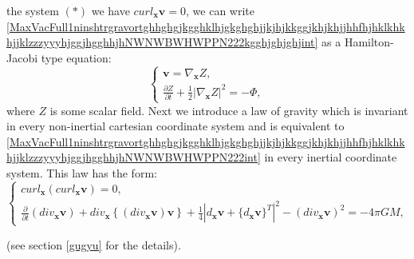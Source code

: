 \documentclass{article}
\theoremstyle{definition}
\theoremstyle{remark}
\renewcommand{\vec}[1]{\mathbf{#1}}
\newcommand{\er}{\eqref}
\newcommand{\er}{\eqref}
\begin{document}
the system $(*)$ we have $curl_{\vec x}\vec v=0$, we can write
\er{MaxVacFull1ninshtrgravortghhghgjkgghklhjgkghghjjkjhjkkggjkhjkhjjhhfhjhklkhkhjjklzzzyyyhjggjhgghhjhNWNWBWHWPPN222kgghjghjghjint}
as a Hamilton-Jacobi type equation:
\begin{equation}
\label{MaxVacFull1ninshtrgravortghhghgjkgghklhjgkghghjjkjhjkkggjkhjkhjjhhfhjhklkhkhjjklzzzyyyhjggjhgghhjhNWNWNWNWNWBWHWPPN222int}
\begin{cases}
\vec v=\nabla_{\vec x}Z,\\
\frac{\partial Z}{\partial t}+\frac{1}{2}\left|\nabla_{\vec
x}Z\right|^2=-\Phi,
\end{cases}
\end{equation}
where $Z$ is some scalar field. Next we introduce a law of gravity
which is invariant in every non-inertial cartesian coordinate system
and is equivalent to
\er{MaxVacFull1ninshtrgravortghhghgjkgghklhjgkghghjjkjhjkkggjkhjkhjjhhfhjhklkhkhjjklzzzyyyhjggjhgghhjhNWNWBWHWPPN222int}
in every inertial coordinate system. This law has the form:
\begin{equation}
\label{MaxVacFull1ninshtrgravortghhghgjkgghklhjgkghghjjkjhjkkggjkhjkhjjhhfhjhklkhkhjjklzzzyyyNWBWHWPPN222int}
\begin{cases}
curl_{\vec x}\left(curl_{\vec x}\vec v\right)= 0,\\
\frac{\partial}{\partial t}\left(div_{\vec x}\vec v\right)+div_{\vec
x}\left\{\left(div_{\vec x}\vec v\right)\vec
v\right\}+\frac{1}{4}\left|d_{\vec x}\vec v+\{d_{\vec x}\vec
v\}^T\right|^2-\left(div_{\vec x}\vec v\right)^2= -4\pi GM,
\end{cases}
\end{equation}
%
%
%
\begin{comment}
\begin{equation}
\label{MaxVacFull1ninshtrgravortghhghgjkgghklhjgkghghjjkjhjkkggjkhjkhjjhhfhjhklkhkhjjklzzzyyyNWBWHWPPN222jkgghggyuhgulkip}
\begin{cases}
curl_{\vec x}\left(curl_{\vec x}\vec v\right)= 0,\\
\frac{\partial}{\partial t}\left(div_{\vec x}\vec v\right)+\vec
v\cdot\nabla_{\vec x}\left(div_{\vec x}\vec
v\right)+\frac{1}{4}\left|d_{\vec x}\vec v+\{d_{\vec x}\vec
v\}^T\right|^2= -4\pi GM.
\end{cases}
\end{equation}
\end{comment}
%
%
%
(see section \ref{gugyu} for the details).
\end{document}
